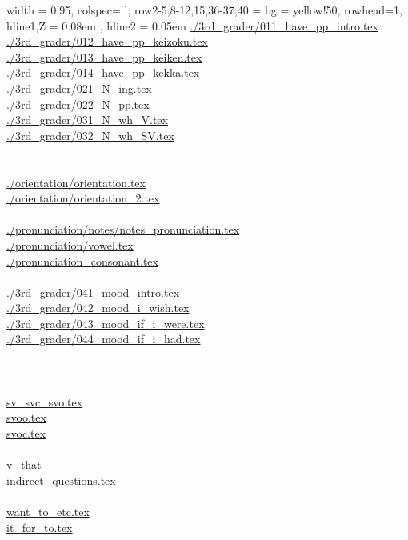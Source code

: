 \documentclass[book,jafontscale=0.9247]{jlreq}
\begin{document}
\begin{longtblr}[caption={Enflish Slides}]{
  width = { 0.95\linewidth },
  colspec= {l},
  row{2-5,8-12,15,36-37,40} = {bg = yellow!50},
  rowhead=1,
  hline{1,Z} = { 0.08em }, %
  hline{2} = { 0.05em } %
}
\url{./3rd_grader/011_have_pp_intro.tex}\\
\url{./3rd_grader/012_have_pp_keizoku.tex}\\
\url{./3rd_grader/013_have_pp_keiken.tex}\\
\url{./3rd_grader/014_have_pp_kekka.tex}\\
\url{./3rd_grader/021_N_ing.tex}\\
\url{./3rd_grader/022_N_pp.tex}\\
\url{./3rd_grader/031_N_wh_V.tex}\\
\url{./3rd_grader/032_N_wh_SV.tex}\\
\\
\\
\url{./orientation/orientation.tex}\\
\url{./orientation/orientation_2.tex}\\
\\
\url{./pronunciation/notes/notes_pronunciation.tex}\\
\url{./pronunciation/vowel.tex}\\
\url{./pronunciation_consonant.tex}\\
\\
\url{./3rd_grader/041_mood_intro.tex}\\
\url{./3rd_grader/042_mood_i_wish.tex}\\
\url{./3rd_grader/043_mood_if_i_were.tex}\\
\url{./3rd_grader/044_mood_if_i_had.tex}\\
\\
\\
\\
\url{sv_svc_svo.tex}\\
\url{svoo.tex}\\
\url{svoc.tex}\\
\\
\url{v_that}\\
\url{indirect_questions.tex}\\
\\
\url{want_to_etc.tex}\\
\url{it_for_to.tex}
\end{longtblr}
\normalsize
\end{document}
